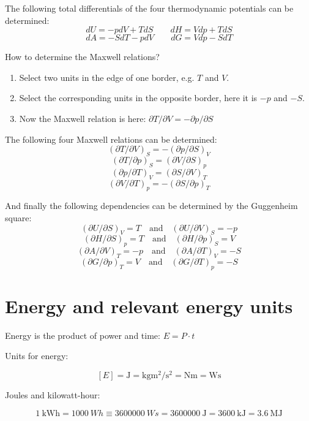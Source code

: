 \documentclass[11pt,a4paper,english,twoside]{scrreprt}
\begin{document}
The following total differentials of the four thermodynamic potentials can be determined:
\[dU = -pdV + TdS \qquad dH = Vdp + TdS \]
\[dA = -SdT -pdV \qquad dG = Vdp - SdT\]


How to determine the Maxwell relations?
\begin{enumerate}
	\item Select two units in the edge of one border, e.g. $T$ and $V$.
	\item Select the corresponding units in the opposite border, here it is $-p$ and $-S$.
	\item Now the Maxwell relation is here: $\partial T/\partial V = -\partial p/\partial S$ 
\end{enumerate}

The following four Maxwell relations can be determined:
\[(\partial T/\partial V)_S = -(\partial p/\partial S)_V\] 
\[(\partial T/\partial p)_S =  (\partial V/\partial S)_p\]
\[(\partial p/\partial T)_V =  (\partial S/\partial V)_T\]
\[(\partial V/\partial T)_p = -(\partial S/\partial p)_T\]

And finally the following dependencies can be determined by the Guggenheim square:
\[(\partial U/\partial S)_V =  T \quad \mbox{and} \quad (\partial U/\partial V)_S = -p\]
\[(\partial H/\partial S)_p =  T \quad \mbox{and} \quad (\partial H/\partial p)_S =  V\]
\[(\partial A/\partial V)_T = -p \quad \mbox{and} \quad (\partial A/\partial T)_V = -S\]
\[(\partial G/\partial p)_T =  V \quad \mbox{and} \quad (\partial G/\partial T)_p = -S\]



\section{Energy and relevant energy units}

Energy is the product of power and time: $E = P \cdot t$

Units for energy:

\[
[E] = \si{\joule} = \si{\kg\meter\squared\per\second\squared} = \si{\newton\meter} = \si{\watt\second}
\]

Joules and kilowatt-hour:


\[
\SI{1}{\kWh} = \SI{1000}{Wh} \equiv \SI{3600000}{Ws} = \SI{3600000}{\joule} = \SI{3600}{\kilo\joule} = \SI{3.6}{\mega\joule}
\]
\end{document}
